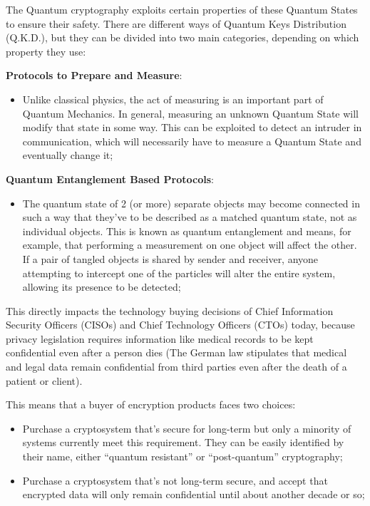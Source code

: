 \documentclass[conference]{IEEEtran}
\begin{document}
The Quantum cryptography exploits certain properties of these Quantum States to ensure their safety. There are different ways of Quantum Keys Distribution (Q.K.D.), but they can be divided into two main categories, depending on which property they use:

\vspace{4pt}

\textbf{Protocols to Prepare and Measure}:

\begin{itemize}
    \item Unlike classical physics, the act of measuring is an important part of Quantum Mechanics. In general, measuring an unknown Quantum State will modify that state in some way. This can be exploited to detect an intruder in communication, which will necessarily have to measure a Quantum State and eventually change it;
\end{itemize}

\textbf{Quantum Entanglement Based Protocols}:

\begin{itemize}
    \item The quantum state of 2 (or more) separate objects may become connected in such a way that they've to be described as a matched quantum state, not as individual objects. This is known as quantum entanglement and means, for example, that performing a measurement on one object will affect the other. If a pair of tangled objects is shared by sender and receiver, anyone attempting to intercept one of the particles will alter the entire system, allowing its presence to be detected;
\end{itemize}


\vspace{4pt}

This directly impacts the technology buying decisions of Chief Information Security Officers (CISOs) and Chief Technology Officers (CTOs) today, because privacy legislation requires information like medical records to be kept confidential even after a person dies (The German law stipulates that medical and legal data remain confidential from third parties even after the death of a patient or client).

\vspace{4pt}

This means that a buyer of encryption products faces two choices:

\begin{itemize}
    \item Purchase a cryptosystem that's secure for long-term but only a minority of systems currently meet this requirement. They can be easily identified by their name, either “quantum resistant” or “post-quantum” cryptography;
    \item  Purchase a cryptosystem that's not long-term secure, and accept that encrypted data will only remain confidential until about another decade or so;
\end{itemize}
\end{document}
